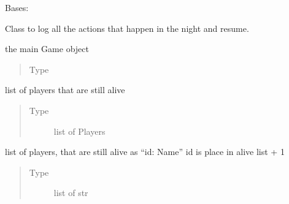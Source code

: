 \documentclass[letterpaper,10pt,english]{sphinxmanual}
\begin{document}
\begin{fulllineitems}
\label{\detokenize{chatwolf:chatwolf.nightactions.Nightactions}}
Bases: 

Class to log all the actions that happen in the night and resume.

\begin{fulllineitems}
\label{\detokenize{chatwolf:chatwolf.nightactions.Nightactions.game}}
the main Game object
\begin{quote}\begin{description}
\item[{Type}] \leavevmode
{\hyperref[\detokenize{chatwolf:chatwolf.game.Game}]{}}

\end{description}\end{quote}

\end{fulllineitems}


\begin{fulllineitems}
\label{\detokenize{chatwolf:chatwolf.nightactions.Nightactions.alive}}
list of players that are still alive
\begin{quote}\begin{description}
\item[{Type}] \leavevmode
list of Players

\end{description}\end{quote}

\end{fulllineitems}


\begin{fulllineitems}
\label{\detokenize{chatwolf:chatwolf.nightactions.Nightactions.alive_string}}
list of players, that are still alive as “id: Name”
id is place in alive list + 1
\begin{quote}\begin{description}
\item[{Type}] \leavevmode
list of str


\end{description}
\end{quote}
\end{fulllineitems}
\end{fulllineitems}
\end{document}
